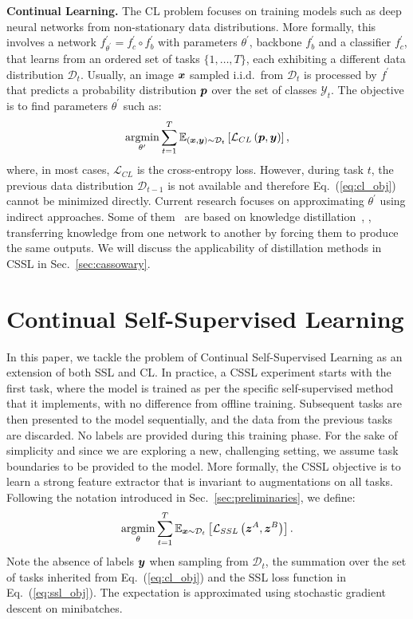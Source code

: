 \noindent\textbf{Continual Learning.}
The CL problem focuses on training models such as deep neural networks from non-stationary data distributions. More formally, this involves a network $f^{\prime}_{\theta^{\prime}} = f^{\prime}_c \circ f^{\prime}_b $ with parameters $\theta^{\prime}$, backbone $f^{\prime}_b$ and a classifier $f^{\prime}_c$, that learns from an ordered set of tasks $\{1,\dots, T\}$, each exhibiting a different data distribution $\mathcal{D}_t$. Usually, an image $\boldsymbol{x}$ sampled i.i.d.\ from $\mathcal{D}_t$ is processed by $f^{\prime}$ that predicts a probability distribution $\boldsymbol{p}$ over the set of classes $\mathcal{Y}_t$. The objective is to find parameters $\theta^{\prime}$ such as:
\begin{equation}
\label{eq:cl_obj}
\underset{\theta^{\prime}}{\operatorname{argmin}} \sum_{t=1}^{T} \mathbb{E}_{(\boldsymbol{x}, \boldsymbol{y}) \sim \mathcal{D}_{t}}\left[\mathcal{L}_{CL}\left(\boldsymbol{p}, \boldsymbol{y}\right)\right],
\end{equation}
where, in most cases, $\mathcal{L}_{CL}$ is the cross-entropy loss. However, during task $t$, the previous data distribution $\mathcal{D}_{t-1}$ is not available and therefore Eq.~(\ref{eq:cl_obj}) cannot be minimized directly. Current research focuses on approximating $\theta^{\prime}$ using indirect approaches. Some of them~\cite{Li17learning, douillard2020podnet} are based on knowledge distillation~\cite{hinton2015distilling}, \ie, transferring knowledge from one network to another by forcing them to produce the same outputs. We will discuss the applicability of distillation methods in CSSL in Sec.~\ref{sec:cassowary}.

\vspace{-5pt}
\section{Continual Self-Supervised Learning}
\label{sec:cssl}
In this paper, we tackle the problem of Continual Self-Supervised Learning 
as an extension of both SSL and CL.
In practice, a CSSL experiment starts with the first task, where the model is trained as per the specific self-supervised method that it implements, with no difference from offline training. Subsequent tasks are then presented to the model sequentially, and the data from the previous tasks are discarded.
No labels are provided during this training phase. For the sake of simplicity and since we are exploring a new, challenging setting, we assume task boundaries to be provided to the model.
More formally, the CSSL objective is to learn a strong feature extractor that is invariant to augmentations on all tasks. Following the notation introduced in Sec.~\ref{sec:preliminaries},  we define: 
\begin{equation}
\label{eq:continual_erm}
\underset{\theta}{\operatorname{argmin}} \sum_{t=1}^{T} \mathbb{E}_{\boldsymbol{x} \sim \mathcal{D}_{t}}\left[\mathcal{L}_{SSL}\left(\boldsymbol{z}^A, \boldsymbol{z}^B\right)\right].
\end{equation}
Note the absence of labels $\boldsymbol{y}$ when sampling from $\mathcal{D}_t$, the summation over the set of tasks inherited from Eq.~(\ref{eq:cl_obj}) and the SSL loss function in Eq.~(\ref{eq:ssl_obj}). The expectation is approximated using stochastic gradient descent on minibatches.

